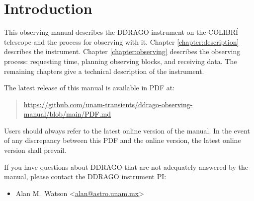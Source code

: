 \chapter{Introduction}

This observing manual describes the DDRAGO instrument on the COLIBRÍ telescope and the process for observing with it.
Chapter \ref{chapter:description} describes the instrument.
Chapter \ref{chapter:observing} describes the observing process: requesting time, planning observing blocks, and receiving data.
The remaining chapters give a technical description of the instrument.

The latest release of this manual is available in PDF at:

\begin{quote}
    \url{https://github.com/unam-transients/ddrago-observing-manual/blob/main/PDF.md}
\end{quote}

Users should always refer to the latest online version of the manual. In the
event of any discrepancy between this PDF and the online version, the latest
online version shall prevail.

If you have questions about DDRAGO that are not adequately answered by the manual, please contact the DDRAGO instrument PI:
\begin{itemize}
    \item Alan M.\ Watson <\href{mailto:alan@astro.unam.mx}{alan@astro.unam.mx}>
\end{itemize}
